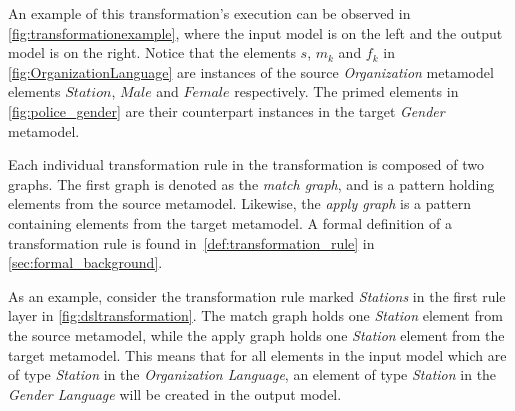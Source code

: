 
An example of this transformation's execution can be observed in \cref{fig:transformationexample}, where the input model is on the left and the output model is on the right. Notice that the elements $s$, $m_k$  and $f_k$ in \cref{fig:OrganizationLanguage} are instances of the source \emph{Organization} metamodel elements $Station$, $Male$ and $Female$ respectively. The primed elements in \cref{fig:police_gender} are their counterpart instances in the target \emph{Gender} metamodel.

Each individual transformation rule in the transformation is composed of two graphs. The first graph
is denoted as the \emph{match graph}, and is a pattern holding elements from the
source metamodel. Likewise, the \emph{apply graph} is a pattern containing
elements from the target metamodel. A formal definition of a transformation rule is found in~\cref{def:transformation_rule} in \cref{sec:formal_background}.

As an example, consider the transformation rule marked \emph{Stations} in the
first rule layer in \cref{fig:dsltransformation}. The match graph holds
one \emph{Station} element from the source metamodel, while the apply graph
holds one \emph{Station} element from the target metamodel. This means that for all
elements in the input model which are of type \emph{Station} in the
\emph{Organization Language}, an element of type
\emph{Station} in the \emph{Gender Language} will be created in the output model.

